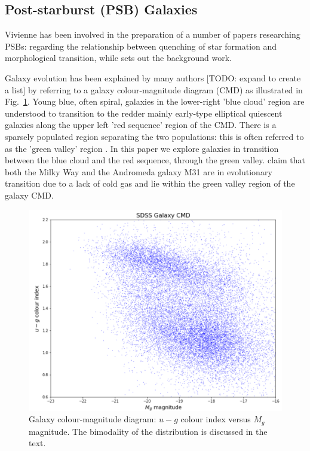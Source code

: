 \subsection{Post-starburst (PSB) Galaxies}
\label{sec:PSBs}
Vivienne has been involved in the preparation of a number of papers researching PSBs: \citet{2017MNRAS.472.1401A} regarding the relationship between quenching of star formation and morphological transition, while \citet{2016MNRAS.463..832W} sets out the background work.
\par Galaxy evolution has been explained by many authors [TODO: expand to create a list] \citep{baldry2004quantifying,2006MNRAS.373..469B} by referring to a galaxy colour-magnitude diagram (CMD) \citep[see e.g.][]{ 2003ApJ...585L...5H, 2003ApJS..149..289B} as illustrated in Fig.~\ref{fig:CMD1}. Young blue, often spiral, galaxies in the lower-right 'blue cloud' region are understood to transition to the redder mainly early-type elliptical quiescent galaxies along the upper left 'red sequence' region of the CMD. There is a sparsely populated region separating the two populations: this is often referred to as the 'green valley' region \citep{2004ApJ...608..752B}. In this paper we explore galaxies in transition between the blue cloud and the red sequence, through the green valley.
\citet{Mutch_2011} claim that both the Milky Way and the Andromeda galaxy M31 are in evolutionary transition due to a lack of cold gas and lie within the green valley region of the galaxy CMD.

\begin{figure}
	\includegraphics[width=\columnwidth]{images/CMDs/galaxyCMD.PNG}
    \caption{Galaxy colour-magnitude diagram: $u-g$ colour index versus $M_g$ magnitude. The bimodality of the distribution is discussed in the text.}
    \label{fig:CMD1}
\end{figure}